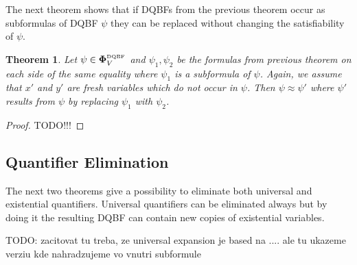 \documentclass[
  digital, %
  twoside, %
  table,   %
  nolof,     %
  nolot,     %
]{fithesis3}
\newtheorem{theorem}{Theorem}[chapter] %
\theoremstyle{definition}
\theoremstyle{remark}
\newcommand{\DQBF}[1]{\mathbf{\Phi}_{#1}^{\normalfont{\text{\tiny DQBF}}}}
\begin{document}
The next theorem shows that if DQBFs from the previous theorem occur as subformulas of DQBF $\psi$ they can be replaced without changing the satisfiability of $\psi$.

\begin{theorem}
  Let $\psi \in \DQBF{V}$ and $\psi_1, \psi_2$ be the formulas from previous theorem on each side of the same equality where $\psi_1$ is a subformula of $\psi$. Again, we assume that $x'$ and $y'$ are fresh variables which do not occur in $\psi$. Then $\psi \approx \psi'$ where $\psi'$ results from $\psi$ by replacing $\psi_1$ with $\psi_2$.
\end{theorem}
\begin{proof}
  TODO!!!
\end{proof}

\subsection{Quantifier Elimination}
The next two theorems give a possibility to eliminate both universal and existential quantifiers. Universal quantifiers can be eliminated always but by doing it the resulting DQBF can contain new copies of existential variables.

TODO: zacitovat tu treba, ze universal expansion je based na .... ale tu ukazeme verziu kde nahradzujeme vo vnutri subformule
\end{document}
